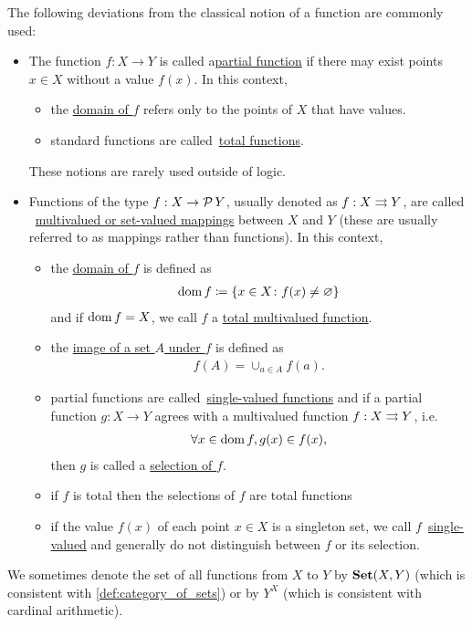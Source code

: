 \begin{definition}
  The following deviations from the classical notion of a function are commonly used:
  \begin{itemize}
    \item\label{def:function/partial} The function $f: X \to Y$ is called a\ul{partial function} if there may exist points $x \in X$ without a value $f(x)$. In this context,
    \begin{itemize}
      \item the \ul{domain of $f$} refers only to the points of $X$ that have values.
      \item standard functions are called~\ul{total functions}.
    \end{itemize}

    These notions are rarely used outside of logic.

    \item\label{def:function/multivalued} Functions of the type $f: X \to \operatorname{\mathcal P} Y$, usually denoted as $f: X \rightrightarrows Y$, are called ~\ul{multivalued or set-valued mappings} between $X$ and $Y$ (these are usually referred to as mappings rather than functions). In this context,
    \begin{itemize}
      \item the \ul{domain of $f$} is defined as
      \begin{align*}
        \operatorname{dom} f \coloneqq \{ x \in X \colon f(x) \neq \varnothing \}
      \end{align*}
      and if $\operatorname{dom} f = X$, we call $f$ a \ul{total multivalued function}.

      \item the \ul{image of a set $A$ under $f$} is defined as
      \begin{align*}
        f(A) = \cup_{a \in A} f(a).
      \end{align*}

      \item partial functions are called~\ul{single-valued functions} and if a partial function $g: X \to Y$ agrees with a multivalued function $f: X \rightrightarrows Y$, i.e.
      \begin{align*}
        \forall x \in \operatorname{dom} f, g(x) \in f(x),
      \end{align*}
      then $g$ is called a \ul{selection of $f$}.

      \item if $f$ is total then the selections of $f$ are total functions

      \item if the value $f(x)$ of each point $x \in X$ is a singleton set, we call $f$~\ul{single-valued} and generally do not distinguish between $f$ or its selection.
    \end{itemize}
  \end{itemize}

  We sometimes denote the set of all functions from $X$ to $Y$ by $\operatorname{\mathbf{Set}}(X, Y)$ (which is consistent with \cref{def:category_of_sets}) or by $Y^X$ (which is consistent with cardinal arithmetic).
\end{definition}

